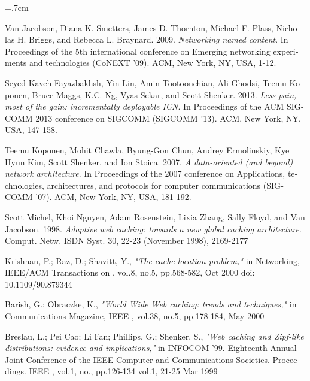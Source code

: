 \renewcommand{\bibname}{مراجع}

\begin{thebibliography}{99}

\begin{latin}

\baselineskip=.7cm

Van Jacobson, Diana K. Smetters, James D. Thornton, Michael F. Plass, Nicholas H. Briggs, and Rebecca L. Braynard. 2009. \textit{Networking named content}. In Proceedings of the 5th international conference on Emerging networking experiments and technologies (CoNEXT '09). ACM, New York, NY, USA, 1-12.

Seyed Kaveh Fayazbakhsh, Yin Lin, Amin Tootoonchian, Ali Ghodsi, Teemu Koponen, Bruce Maggs, K.C. Ng, Vyas Sekar, and Scott Shenker. 2013. \textit{Less pain, most of the gain: incrementally deployable ICN}. In Proceedings of the ACM SIGCOMM 2013 conference on SIGCOMM (SIGCOMM '13). ACM, New York, NY, USA, 147-158. 

Teemu Koponen, Mohit Chawla, Byung-Gon Chun, Andrey Ermolinskiy, Kye Hyun Kim, Scott Shenker, and Ion Stoica. 2007. \textit{A data-oriented (and beyond) network architecture}. In Proceedings of the 2007 conference on Applications, technologies, architectures, and protocols for computer communications (SIGCOMM '07). ACM, New York, NY, USA, 181-192. 

Scott Michel, Khoi Nguyen, Adam Rosenstein, Lixia Zhang, Sally Floyd, and Van Jacobson. 1998. \textit{Adaptive web caching: towards a new global caching architecture}. Comput. Netw. ISDN Syst. 30, 22-23 (November 1998), 2169-2177


Krishnan, P.; Raz, D.; Shavitt, Y., \textit{"The cache location problem,"} in Networking, IEEE/ACM Transactions on , vol.8, no.5, pp.568-582, Oct 2000
doi: 10.1109/90.879344

Barish, G.; Obraczke, K., \textit{"World Wide Web caching: trends and techniques,"} in Communications Magazine, IEEE , vol.38, no.5, pp.178-184, May 2000

Breslau, L.; Pei Cao; Li Fan; Phillips, G.; Shenker, S., \textit{"Web caching and Zipf-like distributions: evidence and implications,"} in INFOCOM '99. Eighteenth Annual Joint Conference of the IEEE Computer and Communications Societies. Proceedings. IEEE , vol.1, no., pp.126-134 vol.1, 21-25 Mar 1999


\end{latin}
\end{thebibliography}
